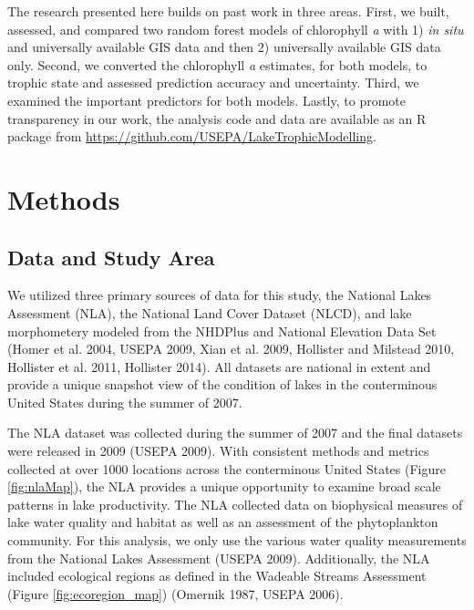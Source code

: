 \documentclass[12pt,]{article}
\begin{document}
The research presented here builds on past work in three areas. First,
we built, assessed, and compared two random forest models of chlorophyll
\emph{a} with 1) \emph{in situ} and universally available GIS data and
then 2) universally available GIS data only. Second, we converted the
chlorophyll \emph{a} estimates, for both models, to trophic state and
assessed prediction accuracy and uncertainty. Third, we examined the
important predictors for both models. Lastly, to promote transparency in
our work, the analysis code and data are available as an R package from
\url{https://github.com/USEPA/LakeTrophicModelling}.

\section{Methods}\label{methods}

\subsection{Data and Study Area}\label{data-and-study-area}

We utilized three primary sources of data for this study, the National
Lakes Assessment (NLA), the National Land Cover Dataset (NLCD), and lake
morphometery modeled from the NHDPlus and National Elevation Data Set
(Homer et al. 2004, USEPA 2009, Xian et al. 2009, Hollister and Milstead
2010, Hollister et al. 2011, Hollister 2014). All datasets are national
in extent and provide a unique snapshot view of the condition of lakes
in the conterminous United States during the summer of 2007.

The NLA dataset was collected during the summer of 2007 and the final
datasets were released in 2009 (USEPA 2009). With consistent methods and
metrics collected at over 1000 locations across the conterminous United
States (Figure \ref{fig:nlaMap}), the NLA provides a unique opportunity
to examine broad scale patterns in lake productivity. The NLA collected
data on biophysical measures of lake water quality and habitat as well
as an assessment of the phytoplankton community. For this analysis, we
only use the various water quality measurements from the National Lakes
Assessment (USEPA 2009). Additionally, the NLA included ecological
regions as defined in the Wadeable Streams Assessment (Figure
\ref{fig:ecoregion_map}) (Omernik 1987, USEPA 2006).
\end{document}

